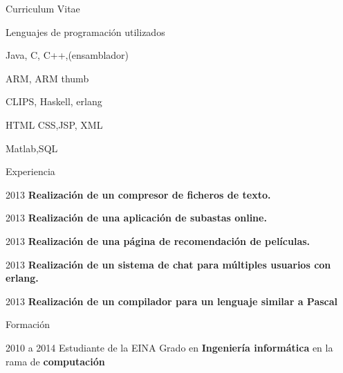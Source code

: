 \begin{cv}{Curriculum Vitae}


\begin{cvlist}{Lenguajes de programación utilizados}
\item Java, C, C++,(ensamblador)
\item ARM, ARM thumb
\item CLIPS, Haskell, erlang
\item HTML CSS,JSP, XML
\item Matlab,SQL
\end{cvlist}

\begin{cvlist}{Experiencia}

	\item[2013] \textbf{Realización de un compresor de ficheros de texto.}\\

	\item[2013] \textbf{Realización de una aplicación de subastas online.}\\

	\item[2013] \textbf{Realización de una página de recomendación de películas.}\\
	
	\item[2013] \textbf{Realización de un sistema de chat para múltiples usuarios con erlang.}
	
	\item[2013] \textbf{Realización de un compilador para un lenguaje similar a Pascal}
	

\end{cvlist}

\begin{cvlist}{Formación}

	\item[2010 a 2014] Estudiante de la EINA
		Grado en \textbf{Ingeniería informática} en la rama de \textbf{computación}\\


\end{cvlist}

\end{cv}